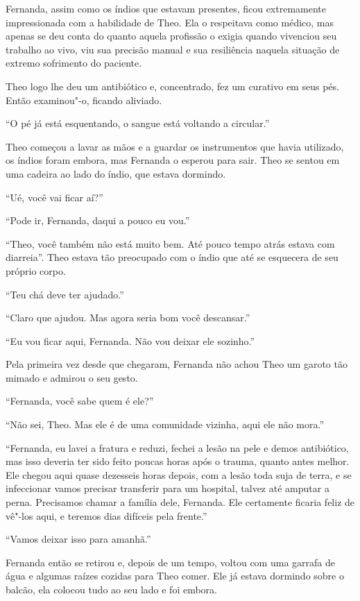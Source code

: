 Fernanda, assim como os índios que estavam presentes, ficou extremamente
impressionada com a habilidade de Theo. Ela o respeitava como médico,
mas apenas se deu conta do quanto aquela profissão o exigia quando
vivenciou seu trabalho ao vivo, viu sua precisão manual e sua
resiliência naquela situação de extremo sofrimento do paciente.

Theo logo lhe deu um antibiótico e, concentrado, fez um curativo em
seus pés. Então examinou"-o, ficando aliviado.

``O pé já está esquentando, o sangue está voltando a circular.''

Theo começou a lavar as mãos e a guardar os instrumentos que havia
utilizado, os índios foram embora, mas Fernanda o esperou para sair.
Theo se sentou em uma cadeira ao lado do índio, que estava dormindo.

``Ué, você vai ficar aí?''

``Pode ir, Fernanda, daqui a pouco eu vou.''

``Theo, você também não está muito bem. Até pouco tempo atrás estava com
diarreia''. Theo estava tão preocupado com o índio que até se esquecera
de seu próprio corpo.

``Teu chá deve ter ajudado.''

``Claro que ajudou. Mas agora seria bom você descansar.''

``Eu vou ficar aqui, Fernanda. Não vou deixar ele sozinho.''

Pela primeira vez desde que chegaram, Fernanda não achou Theo um garoto
tão mimado e admirou o seu gesto.

``Fernanda, você sabe quem é ele?''

``Não sei, Theo. Mas ele é de uma comunidade vizinha, aqui ele não
mora.''

``Fernanda, eu lavei a fratura e reduzi, fechei a lesão na pele e demos
antibiótico, mas isso deveria ter sido feito poucas horas após o
trauma, quanto antes melhor. Ele chegou aqui quase dezesseis horas depois, com
a lesão toda suja de terra, e se infeccionar vamos precisar transferir
para um hospital, talvez até amputar a perna. Precisamos chamar a
família dele, Fernanda. Ele certamente ficaria feliz de vê"-los aqui, e
teremos dias difíceis pela frente.''

``Vamos deixar isso para amanhã.''

Fernanda então se retirou e, depois de um tempo, voltou com uma garrafa
de água e algumas raízes cozidas para Theo comer. Ele já estava dormindo
sobre o balcão, ela colocou tudo ao seu lado e foi embora.

